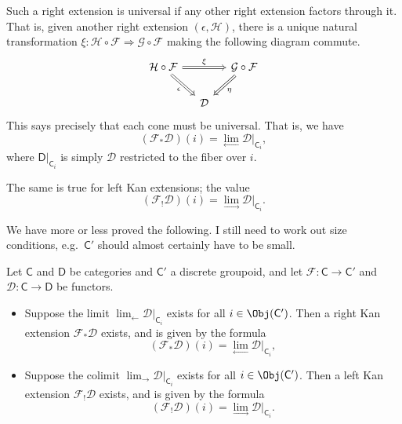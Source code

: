 \documentclass[main.tex]{subfiles}
\begin{document}
\begin{example}
  Such a right extension is universal if any other right extension factors through it. That is, given another right extension $(\epsilon, \mathcal{H})$, there is a unique natural transformation $\xi\colon \mathcal{H} \circ \mathcal{F} \Rightarrow \mathcal{G} \circ \mathcal{F}$ making the following diagram commute.
  \begin{equation*}
    \begin{tikzcd}[column sep=small]
      \mathcal{H} \circ \mathcal{F}
      \arrow[rr, Rightarrow, "\xi"]
      \arrow[dr, Rightarrow, swap, "\epsilon"]
      && \mathcal{G} \circ \mathcal{F}
      \arrow[dl, Rightarrow, "\eta"]
      \\
      & \mathcal{D}
    \end{tikzcd}
  \end{equation*}
  This says precisely that each cone must be universal. That is, we have
  \begin{equation*}
    (\mathcal{F}_{*}\mathcal{D})(i) = \lim_{\leftarrow} \mathcal{D}|_{\mathsf{C}_{i}},
  \end{equation*}
  where $\mathsf{D}|_{\mathsf{C}_{i}}$ is simply $\mathcal{D}$ restricted to the fiber over $i$.

  The same is true for left Kan extensions; the value
  \begin{equation*}
    (\mathcal{F}_{!}\mathcal{D})(i) = \lim_{\rightarrow} \mathcal{D}|_{\mathsf{C}_{i}}.
  \end{equation*}
\end{example}

We have more or less proved the following. I still need to work out size conditions, e.g.\ $\mathsf{C}'$ should almost certainly have to be small.
\begin{proposition}
  \label{prop:formula_for_kan_extension_through_groupoid}
  Let $\mathsf{C}$ and $\mathsf{D}$ be categories and $\mathsf{C}'$ a discrete groupoid, and let $\mathcal{F}\colon \mathsf{C} \to \mathsf{C}'$ and $\mathcal{D}\colon \mathsf{C} \to \mathsf{D}$ be functors.
  \begin{itemize}
    \item Suppose the limit $\lim_{\leftarrow}\mathcal{D}|_{\mathsf{C}_{i}}$ exists for all $i \in \Obj(\mathsf{C}')$. Then a right Kan extension $\mathcal{F}_{*}\mathcal{D}$ exists, and is given by the formula
      \begin{equation*}
        (\mathcal{F}_{*}\mathcal{D})(i) = \lim_{\leftarrow} \mathcal{D}|_{\mathsf{C}_{i}},
      \end{equation*}

    \item Suppose the colimit $\lim_{\rightarrow}\mathcal{D}|_{\mathsf{C}_{i}}$ exists for all $i \in \Obj(\mathsf{C}')$. Then a left Kan extension $\mathcal{F}_{!}\mathcal{D}$ exists, and is given by the formula
      \begin{equation*}
        (\mathcal{F}_{!}\mathcal{D})(i) = \lim_{\rightarrow} \mathcal{D}|_{\mathsf{C}_{i}}.
      \end{equation*}
  \end{itemize}
\end{proposition}
\end{document}
